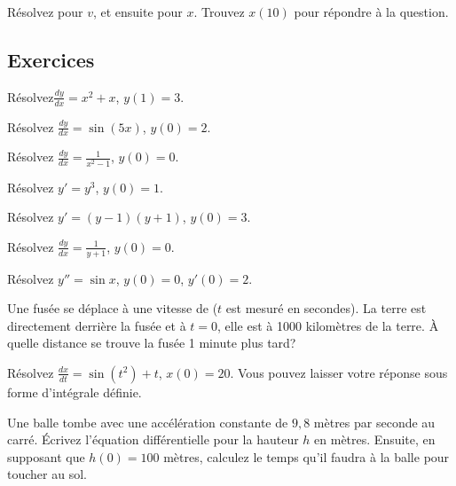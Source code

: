 \begin{exercise}
Résolvez pour $v$, et ensuite pour $x$.  Trouvez $x(10)$ pour répondre à la question.
\end{exercise}

\subsection{Exercices}

\begin{exercise}
Résolvez$\frac{dy}{dx} = x^2+x$, $y(1)=3$.
\end{exercise}

\begin{exercise}
Résolvez $\frac{dy}{dx} = \sin (5x)$, $y(0)=2$.
\end{exercise}

\begin{exercise}
Résolvez $\frac{dy}{dx} = \frac{1}{x^2-1}$, $y(0)=0$.
\end{exercise}

\begin{exercise}
Résolvez $y' = y^3$, $y(0)=1$.
\end{exercise}

\begin{exercise}
Résolvez $y' = (y-1)(y+1)$, $y(0)=3$.
\end{exercise}

\begin{exercise}
Résolvez $\frac{dy}{dx} = \frac{1}{y+1}$, $y(0)=0$.
\end{exercise}

\begin{exercise}
Résolvez $y'' = \sin x$, $y(0)=0$, $y'(0) = 2$.
\end{exercise}

\begin{exercise}
Une fusée se déplace à une vitesse de  ($t$ est mesuré en secondes).  La terre est directement derrière la fusée et à $t=0$, elle est à 1000 kilomètres de la terre.  À quelle distance se trouve la fusée 1 minute plus tard?
\end{exercise}

\begin{exercise}
Résolvez $\frac{dx}{dt} = \sin(t^2)+t$, $x(0)=20$.  Vous pouvez laisser votre réponse sous forme d'intégrale définie.
\end{exercise}

\begin{exercise}
Une balle tombe avec une accélération constante de $9,8$ mètres par seconde au carré.  Écrivez l'équation différentielle pour la hauteur $h$ en mètres.  Ensuite, en supposant que $h(0) = 100$ mètres, calculez le temps qu'il faudra à la balle pour toucher au sol.

\end{exercise}

